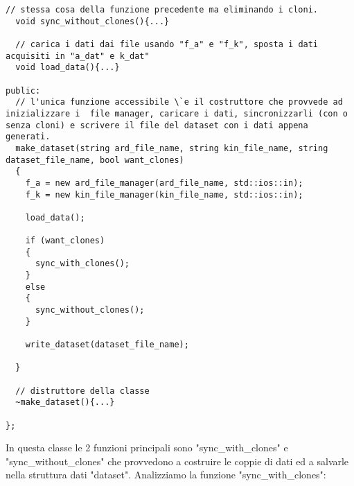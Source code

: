 \documentclass[10pt,a4paper]{article}
\begin{document}
\begin{lstlisting}[style=mycpp, caption=classe make\_dataset, captionpos=b]
  // stessa cosa della funzione precedente ma eliminando i cloni.
  void sync_without_clones(){...}

  // carica i dati dai file usando "f_a" e "f_k", sposta i dati acquisiti in "a_dat" e k_dat"
  void load_data(){...}

public:
  // l'unica funzione accessibile \`e il costruttore che provvede ad inizializzare i  file manager, caricare i dati, sincronizzarli (con o senza cloni) e scrivere il file del dataset con i dati appena generati.
  make_dataset(string ard_file_name, string kin_file_name, string dataset_file_name, bool want_clones)
  {
    f_a = new ard_file_manager(ard_file_name, std::ios::in);
    f_k = new kin_file_manager(kin_file_name, std::ios::in);

    load_data();
    
    if (want_clones)
    {
      sync_with_clones();
    }
    else
    {
      sync_without_clones();
    }

    write_dataset(dataset_file_name);

  }

  // distruttore della classe
  ~make_dataset(){...}

};
\end{lstlisting}
In questa classe le 2 funzioni principali sono "sync\_with\_clones" e "sync\_without\_clones" che provvedono a costruire le coppie di dati ed a salvarle nella struttura dati "dataset".
Analizziamo la funzione "sync\_with\_clones":
\end{document}
